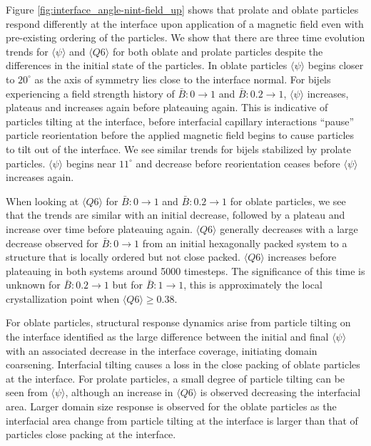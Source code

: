 Figure \ref{fig:interface_angle-nint-field_up} shows that
prolate and oblate particles respond differently at the interface upon application of a magnetic field
even with pre-existing ordering of the particles. We
show that there are three time evolution trends for
$\langle \psi \rangle$ and $\langle Q6 \rangle$ for both oblate and
prolate particles despite the differences in the initial state of the
particles. In oblate particles $\langle \psi \rangle$ begins closer to
$20 ^{\circ}$ as the axis of symmetry lies close to the interface
normal. For bijels experiencing a field strength history of
$\bar{B}: 0 \rightarrow 1$ and $\bar{B}: 0.2 \rightarrow 1$,
$\langle \psi \rangle$ increases, plateaus and increases again before
plateauing again. This is indicative of particles tilting at the
interface, before interfacial capillary interactions ``pause'' particle
reorientation before the applied magnetic field begins to cause
particles to tilt out of the interface. We see similar trends for bijels
stabilized by prolate particles. $\langle \psi \rangle$ begins near
$11 ^{\circ}$ and decrease before reorientation ceases before
$\langle \psi \rangle$ increases again.

When looking at $\langle Q6 \rangle$ for $\bar{B}: 0 \rightarrow 1$
and $\bar{B}: 0.2 \rightarrow 1$ for oblate particles, we see that the
trends are similar with an initial decrease, followed by a plateau and
increase over time before plateauing again. $\langle Q6 \rangle$
generally decreases with a large decrease observed for
\(\bar{B}: 0 \rightarrow 1\) from an initial hexagonally packed system
to a structure that is locally ordered but not close packed. $\langle Q6 \rangle$ increases before plateauing 
in both systems around 5000 timesteps. The significance of
this time is unknown for $\bar{B}: 0.2 \rightarrow 1$ but for
$\bar{B}: 1 \rightarrow 1$, this is approximately the local
crystallization point when $\langle Q6 \rangle \geq 0.38$.

For oblate particles, structural response dynamics
arise from particle tilting on the interface identified as the large
difference between the initial and final $\langle \psi \rangle$ with
an associated decrease in the interface coverage, initiating domain
coarsening. Interfacial tilting causes a loss in the
close packing of oblate particles at the interface. For prolate
particles, a small degree of particle tilting can be seen
from $\langle \psi \rangle$, although an increase in $\langle Q6 \rangle$ is observed
decreasing the interfacial area. Larger domain size response is
observed for the oblate particles as the interfacial area change from
particle tilting at the interface is larger than that of particles close
packing at the interface.


